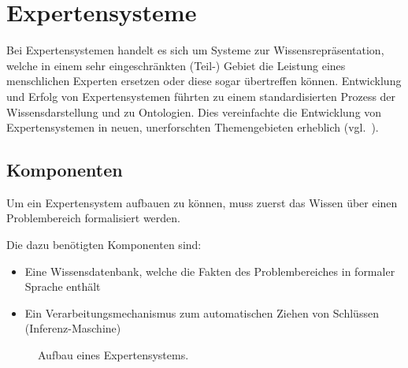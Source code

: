 \chapter{Expertensysteme}
\label{chap:experten_systeme}

Bei Expertensystemen handelt es sich um Systeme zur Wissensrepräsentation, welche in einem sehr eingeschränkten (Teil-) Gebiet die Leistung eines menschlichen Experten ersetzen  oder diese sogar übertreffen können. Entwicklung und Erfolg von Expertensystemen führten zu einem standardisierten Prozess der Wissensdarstellung und zu Ontologien. Dies vereinfachte die Entwicklung von Expertensystemen in neuen, unerforschten Themengebieten erheblich (vgl.~\cite[S. 257]{russel}).

\section{Komponenten}
\label{sec:experten_systeme_komponenten}
Um ein Expertensystem aufbauen zu können, muss zuerst das Wissen über einen Problembereich formalisiert werden.

Die dazu benötigten Komponenten sind:
\begin{itemize}
    \item Eine Wissensdatenbank, welche die Fakten des Problembereiches in formaler Sprache enthält
    \item Ein Verarbeitungsmechanismus zum automatischen Ziehen von Schlüssen (Inferenz-Maschine)
\end{itemize}

\begin{figure}[htbp]
\centering {}
\caption{Aufbau eines Expertensystems.\label{fig:aufbau_expertensysteme}\protect\footnotemark}
\end{figure}

